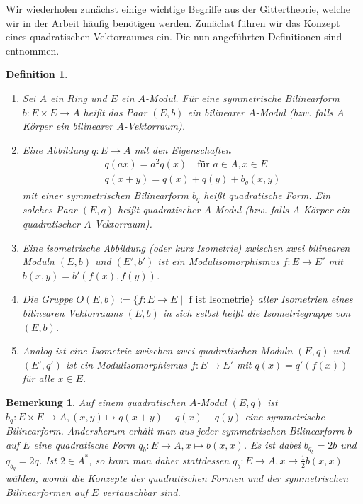 \documentclass[12pt,a4paper,halfparskip,headsepline,bibtotocnumbered]{scrreprt}
\theoremstyle{nummermitklammern}
\newtheorem{definition}[defsatzusw]{Definition}
\newtheorem{bemerkung}[defsatzusw]{Bemerkung}
\theoremstyle{nonumberbreak}
\begin{document}
Wir wiederholen zunächst einige wichtige Begriffe aus der Gittertheorie, welche wir in der Arbeit häufig benötigen werden. Zunächst führen wir das Konzept eines quadratischen Vektorraumes ein. Die nun angeführten Definitionen sind \cite[Def. (2.1)]{kneser} entnommen.

\begin{framed}
	\begin{definition}
		\begin{enumerate}[label=(\roman*)]
			\item Sei $A$ ein Ring und $E$ ein $A$-Modul. Für eine symmetrische Bilinearform\linebreak
				$b : E \times E \rightarrow A$ heißt das Paar $(E,b)$ ein \textit{bilinearer $A$-Modul} (bzw. falls $A$ Körper ein \textit{bilinearer $A$-Vektorraum}).
			\item Eine Abbildung $q : E \rightarrow A$ mit den Eigenschaften
				\begin{align*}
					q(ax) = a^2 q(x)\quad \text{für } a \in A, x \in E\\
					q(x+y) = q(x) + q(y) + b_q(x,y)
				\end{align*}
				mit einer symmetrischen Bilinearform $b_q$ heißt \textit{quadratische Form}. Ein solches Paar $(E,q)$ heißt \textit{quadratischer $A$-Modul} (bzw. falls $A$ Körper ein \textit{quadratischer $A$-Vektorraum}).
			\item Eine \textit{isometrische Abbildung} (oder kurz \textit{Isometrie}) zwischen zwei bilinearen Moduln $(E,b)$ und $(E', b')$ ist ein Modulisomorphismus $f : E \rightarrow E'$ mit $b(x,y) = b'(f(x), f(y))$.
			\item Die Gruppe $O(E,b) := \lbrace f : E \rightarrow E \mid \text{ f ist Isometrie}\rbrace$ aller Isometrien eines bilinearen Vektorraums $(E,b)$ in sich selbst heißt die \textit{Isometriegruppe} von $(E,b)$.
			\item Analog ist eine Isometrie zwischen zwei quadratischen Moduln $(E,q)$ und $(E', q')$ ist ein Modulisomorphismus $f : E \rightarrow E'$ mit $q(x) = q'(f(x))$ für alle $x \in E$.
		\end{enumerate}
	\end{definition}
\end{framed}

\begin{bemerkung}
	Auf einem quadratischen $A$-Modul $(E,q)$ ist $b_q : E \times E \rightarrow A, (x,y) \mapsto q(x+y) - q(x) - q(y)$ eine symmetrische Bilinearform. Andersherum erhält man aus jeder symmetrischen Bilinearform $b$ auf $E$ eine quadratische Form $q_b : E \rightarrow A, x \mapsto b(x,x)$. Es ist dabei $b_{q_b} = 2b$ und $q_{b_q} = 2q$. Ist $2 \in A^*$, so kann man daher stattdessen $q_b : E \rightarrow A, x \mapsto \frac{1}{2} b(x,x)$ wählen, womit die Konzepte der quadratischen Formen und der symmetrischen Bilinearformen auf $E$ vertauschbar sind.
\end{bemerkung}
\end{document}
